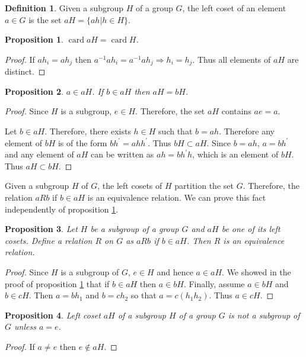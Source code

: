 \documentclass{article}
\DeclareMathOperator{\card}{card}
\theoremstyle{plain}
\numberwithin{thm}{section}
\theoremstyle{plain}
\newtheorem{prop}{Proposition}
\numberwithin{prop}{section}
\theoremstyle{definition}
\newtheorem{defn}{Definition}
\numberwithin{defn}{section}
\theoremstyle{remark}
\numberwithin{equation}{section}
\begin{document}
\begin{defn}\label{s3d2}
Given a subgroup $H$ of a group $G$, the left coset of an element $a \in G$
is the set $aH = \{ah | h \in H\}$.
\end{defn}

\begin{prop}\label{s3p2}
$\card{aH} = \card{H}$.
\end{prop}
\begin{proof}
If $ah_i = ah_j$ then $a^{-1}ah_i = a^{-1}ah_j \Rightarrow h_i = h_j$. Thus
all elements of $aH$ are distinct.
\end{proof}

\begin{prop}\label{s3p3}
$a \in aH$. If $b \in aH$ then $aH = bH$.
\end{prop}
\begin{proof}
Since $H$ is a subgroup, $e \in H$. Therefore, the set $aH$ contains $ae = a$.

Let $b \in aH$. Therefore, there exists $h \in H$ such that $b = ah$. Therefore
any element of $bH$ is of the form $bh^\prime = ahh^\prime$. Thus $bH \subset
aH$. Since $b = ah$, $a = bh^\prime$ and any element of $aH$ can be written
as $ah = bh^\prime h$, which is an element of $bH$. Thus $aH \subset bH$.
\end{proof}

Given a subgroup $H$ of $G$, the left cosets of $H$ partition the set $G$.
Therefore, the relation $a R b$ if $b \in aH$ is an equivalence relation. We
can prove this fact independently of proposition \ref{s3p2}.

\begin{prop}\label{s3p4}
Let $H$ be a subgroup of a group $G$ and $aH$ be one of its left cosets. Define
a relation $R$ on $G$ as $a R b$ if $b \in aH$. Then $R$ is an equivalence
relation.
\end{prop}
\begin{proof}
Since $H$ is a subgroup of $G$, $e \in H$ and hence $a \in aH$. We showed
in the proof of proposition \ref{s3p2} that if $b \in aH$ then $a \in bH$.
Finally, assume $a \in bH$ and $b \in cH$. Then $a = bh_1$ and $b = ch_2$ 
so that $a = c(h_1h_2)$. Thus $a \in cH$.
\end{proof}

\begin{prop}\label{s3p5}
Left coset $aH$ of a subgroup $H$ of a group $G$ is not a subgroup of $G$
unless $a = e$.
\end{prop}
\begin{proof}
If $a \ne e$ then $e \notin aH$.
\end{proof}
\end{document}
